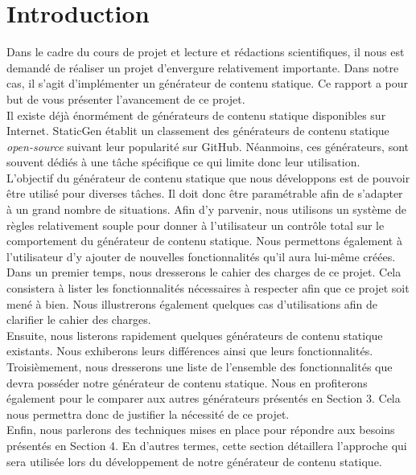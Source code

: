 \section{Introduction}

	Dans le cadre du cours de projet et lecture et rédactions scientifiques, il nous est demandé de réaliser un projet d'envergure relativement importante. Dans notre cas, il s'agit d'implémenter un générateur de contenu statique. Ce rapport a pour but de vous présenter l'avancement de ce projet.\\
	
	Il existe déjà énormément de générateurs de contenu statique  disponibles sur Internet. StaticGen \cite{StaticGen} établit un classement des générateurs de contenu statique \textit{open-source} suivant leur popularité sur GitHub. Néanmoins, ces générateurs, sont souvent dédiés à une tâche spécifique ce qui limite donc leur utilisation.\\
	
	L'objectif du générateur de contenu statique que nous développons est de pouvoir être utilisé pour diverses tâches. Il doit donc être paramétrable afin de s'adapter à un grand nombre de situations. Afin d'y parvenir, nous utilisons un système de règles relativement souple pour donner à l'utilisateur un contrôle total sur le comportement du générateur de contenu statique. Nous permettons également à l'utilisateur d'y ajouter de nouvelles fonctionnalités qu'il aura lui-même créées.\\
	
	Dans un premier temps, nous dresserons le cahier des charges de ce projet. Cela consistera à lister les fonctionnalités nécessaires à respecter afin que ce projet soit mené à bien. Nous illustrerons également quelques cas d'utilisations afin de clarifier le cahier des charges.\\
	
	Ensuite, nous listerons rapidement quelques générateurs de contenu statique existants. Nous exhiberons leurs différences ainsi que leurs fonctionnalités.\\
	
	Troisièmement, nous dresserons une liste de l'ensemble des fonctionnalités que devra posséder notre générateur de contenu statique. Nous en profiterons également pour le comparer aux autres générateurs présentés en Section 3. Cela nous permettra donc de justifier la nécessité de ce projet.\\
	
	Enfin, nous parlerons des techniques mises en place pour répondre aux besoins présentés en Section 4. En d'autres termes, cette section détaillera l'approche qui sera utilisée lors du développement de notre générateur de contenu statique.

	